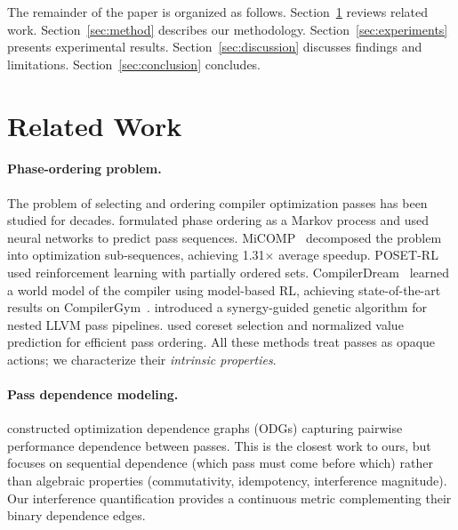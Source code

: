 \documentclass[11pt]{article}
\begin{document}
The remainder of the paper is organized as follows. Section~\ref{sec:related} reviews related work. Section~\ref{sec:method} describes our methodology. Section~\ref{sec:experiments} presents experimental results. Section~\ref{sec:discussion} discusses findings and limitations. Section~\ref{sec:conclusion} concludes.

\section{Related Work}
\label{sec:related}

\paragraph{Phase-ordering problem.}
The problem of selecting and ordering compiler optimization passes has been studied for decades. \citet{kulkarni2012mitigating} formulated phase ordering as a Markov process and used neural networks to predict pass sequences. MiCOMP~\citep{ashouri2017micomp} decomposed the problem into optimization sub-sequences, achieving 1.31$\times$ average speedup. POSET-RL~\citep{jain2022posetrl} used reinforcement learning with partially ordered sets. CompilerDream~\citep{deng2025compilerdream} learned a world model of the compiler using model-based RL, achieving state-of-the-art results on CompilerGym~\citep{cummins2021compilergym}. \citet{pan2025synergy} introduced a synergy-guided genetic algorithm for nested LLVM pass pipelines. \citet{liang2023learning} used coreset selection and normalized value prediction for efficient pass ordering. All these methods treat passes as opaque actions; we characterize their \emph{intrinsic properties}.

\paragraph{Pass dependence modeling.}
\citet{liu2024efficient} constructed optimization dependence graphs (ODGs) capturing pairwise performance dependence between passes. This is the closest work to ours, but focuses on sequential dependence (which pass must come before which) rather than algebraic properties (commutativity, idempotency, interference magnitude). Our interference quantification provides a continuous metric complementing their binary dependence edges.
\end{document}
